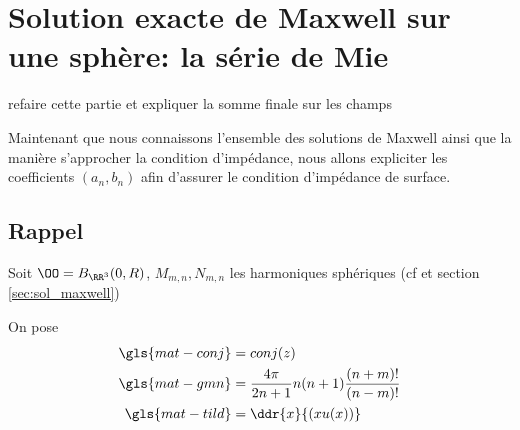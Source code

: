 \section{Solution exacte de Maxwell sur une sphère: la série de Mie}\label{sec:serie_mie}

\begin{REM}
  refaire cette partie et expliquer la somme finale sur les champs
\end{REM}

Maintenant que nous connaissons l'ensemble des solutions de Maxwell ainsi que la manière s'approcher la condition d'impédance, nous allons expliciter les coefficients \((a_n,b_n)\)  afin d'assurer le condition d'impédance de surface.


\subsection{Rappel}
Soit \(\OO = B_{\RR^3}(0,R)\), \(M_{m,n}, N_{m,n}\) les harmoniques sphériques (cf \cite{marceaux_high-order_2000} et section \ref{sec:sol_maxwell})


On pose
\begin{align*}
  \gls{mat-conj} &=conj(z)\\
  \gls{mat-gmn} &=\frac{4\pi}{2n+1}n(n+1)\frac{(n+m)!}{(n-m)!}\\
  \gls{mat-tild} &= \ddr{x}{(xu(x))}
\end{align*}

